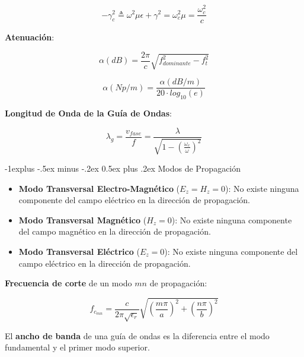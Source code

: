 \documentclass[10pt,landscape]{article}
\makeatletter
\renewcommand{\subsection}{\@startsection{subsection}{2}{0mm}%
                                {-1explus -.5ex minus -.2ex}%
                                {0.5ex plus .2ex}%
                                {\normalfont\normalsize\bfseries}}
\makeatother
\begin{document}
\begin{multicols}{3}
\begin{equation*}
	- \gamma_c^2 \triangleq \omega^2 \mu \epsilon + \gamma^2 = \omega_c^2 \mu = \frac{\omega_c^2}{c}
\end{equation*}

\textbf{Atenuación}:

\begin{equation*}
	\alpha (dB) = \frac{2 \pi}{c} \sqrt{f_{dominante}^2 - f_t^2}
\end{equation*}

\begin{equation*}
	\alpha (Np/m) = \frac{\alpha (dB/m)}{20 \cdot log_{10}(e)}
\end{equation*}

\textbf{Longitud de Onda de la Guía de Ondas}:

\begin{equation*}
	\lambda_g = \frac{v_{fase}}{f} = \frac{\lambda}{ \sqrt{1 - \left( \frac{\omega_c}{\omega}\right) ^2}}
\end{equation*}


\subsection{Modos de Propagación}

\begin{itemize}
	\item \textbf{Modo Transversal Electro-Magnético} ($E_z = H_z = 0$): No existe ninguna componente del campo eléctrico en la dirección de propagación.
	\item \textbf{Modo Transversal Magnético} ($H_z = 0$): No existe ninguna componente del campo magnético en la dirección de propagación.
	\item \textbf{Modo Transversal Eléctrico} ($E_z = 0$): No existe ninguna componente del campo eléctrico en la dirección de propagación.
\end{itemize}

\textbf{Frecuencia de corte} de un modo $mn$ de propagación:

\begin{equation*}
	f_{c_{mn}} = \frac{c}{2 \pi \sqrt{\epsilon_r}} \sqrt{ \left( \frac{m \pi}{a} \right)^2 + \left( \frac{n \pi}{b} \right)^2 }
\end{equation*}

El \textbf{ancho de banda} de una guía de ondas es la diferencia entre el modo fundamental y el primer modo superior.\\


\end{multicols}
\end{document}
